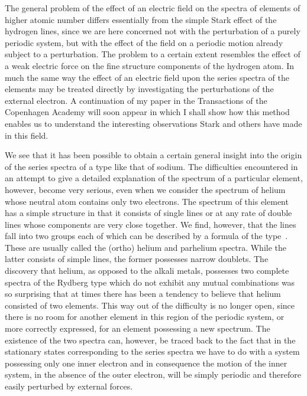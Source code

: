 The general problem of the effect of an electric field on the spectra
of elements of higher atomic number differs essentially from the
simple Stark effect of the hydrogen lines, since we are here concerned
not with the perturbation of a purely periodic system, but
with the effect of the field on a periodic motion already subject to
a perturbation. The problem to a certain extent resembles the
effect of a weak electric force on the fine structure components of
the hydrogen atom. In much the same way the effect of an electric
field upon the series spectra of the elements may be treated directly
by investigating the perturbations of the external electron. A
continuation of my paper in the Transactions of the Copenhagen
Academy will soon appear in which I shall show how this method
enables us to understand the interesting observations Stark and
others have made in this field.


 We see that it has been
possible to obtain a certain general insight into the origin of the
series spectra of a type like that of sodium. The difficulties encountered
in an attempt to give a detailed explanation of the
spectrum of a particular element, however, become very serious,
even when we consider the spectrum of helium whose neutral atom
contains only two electrons. The spectrum of this element has a
simple structure in that it consists of single lines or at any rate of
double lines whose components are very close together. We find,
however, that the lines fall into two groups each of which can be
described by a formula of the type~. These are usually called
the (ortho) helium and parhelium spectra. While the latter consists
of simple lines, the former possesses narrow doublets. The
discovery that helium, as opposed to the alkali metals, possesses
two complete spectra of the Rydberg type which do not exhibit any
mutual combinations was so surprising that at times there has been
a tendency to believe that helium consisted of two elements. This
way out of the difficulty is no longer open, since there is no room
for another element in this region of the periodic system, or more
correctly expressed, for an element possessing a new spectrum. The
existence of the two spectra can, however, be traced back to the fact
that in the stationary states corresponding to the series spectra we
have to do with a system possessing only one inner electron and in
consequence the motion of the inner system, in the absence of the
outer electron, will be simply periodic and therefore easily perturbed
by external forces.

